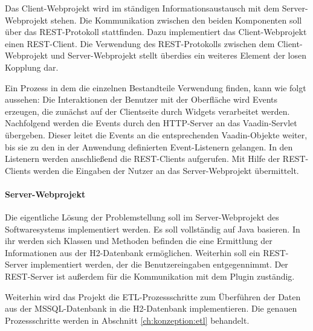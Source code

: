 Das Client-Webprojekt wird im ständigen Informationsaustausch mit dem Server-Webprojekt stehen. Die Kommunikation zwischen den beiden Komponenten soll über das REST-Protokoll stattfinden. Dazu implementiert das Client-Webprojekt einen REST-Client. Die Verwendung des REST-Protokolls zwischen dem Client-Webprojekt und Server-Webprojekt stellt überdies ein weiteres Element der losen Kopplung dar.

Ein Prozess in dem die einzelnen Bestandteile Verwendung finden, kann wie folgt aussehen: Die Interaktionen der Benutzer mit der Oberfläche wird Events erzeugen, die zunächst auf der Clientseite durch Widgets verarbeitet werden. Nachfolgend werden die Events durch den HTTP-Server an das Vaadin-Servlet übergeben. Dieser leitet die Events an die entsprechenden Vaadin-Objekte weiter, bis sie zu den in der Anwendung definierten Event-Listenern gelangen. In den Listenern werden anschließend die REST-Clients aufgerufen. Mit Hilfe der REST-Clients werden die Eingaben der Nutzer an das Server-Webprojekt übermittelt. 

\paragraph{Server-Webprojekt}

Die eigentliche Lösung der Problemstellung soll im Server-Webprojekt des Softwaresystems implementiert werden. Es soll vollständig auf Java basieren. In ihr werden sich Klassen und Methoden befinden die eine Ermittlung der Informationen aus der H2-Datenbank ermöglichen. Weiterhin soll ein REST-Server implementiert werden, der die Benutzereingaben entgegennimmt. Der REST-Server ist außerdem für die Kommunikation mit dem Plugin zuständig.

Weiterhin wird das Projekt die ETL-Prozessschritte zum Überführen der Daten aus der MSSQL-Datenbank in die H2-Datenbank implementieren. Die genauen Prozessschritte werden in Abschnitt \ref{ch:konzeption:etl} behandelt. 



